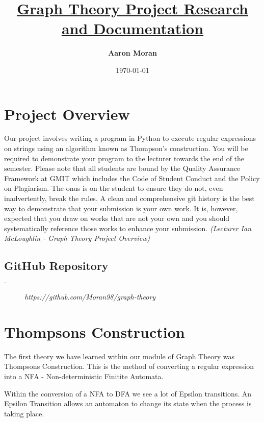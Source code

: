\documentclass[11pt]{article}
\title{\underline{\textbf{ Graph Theory Project Research and Documentation}}}
\author{\textbf{Aaron Moran }}
\date{\today}
\begin{document}
\maketitle	
\pagebreak





\newpage

\tableofcontents

\newpage


\section{Project Overview}
Our project involves writing a program in Python to execute regular expressions on
strings using an algorithm known as Thompson’s construction.
You will be required to
demonstrate your program to the lecturer towards the end of the semester.
Please note that all students are bound by the Quality Assurance Framework at GMIT which includes the Code of Student Conduct and the
Policy on Plagiarism. The onus is on the student to ensure they do not, even
inadvertently, break the rules. A clean and comprehensive git history
 is the best way to demonstrate that your submission is your own
work. It is, however, expected that you draw on works that are not your
own and you should systematically reference those works to enhance your
submission. 
\newline
\emph{(Lecturer Ian McLoughlin - Graph Theory Project Overview)}

\subsection{GitHub Repository}
\begin{description}
\item[$\cdot$]{\emph {https://github.com/Moran98/graph-theory}}
\end{description}
\newpage


\section{Thompsons Construction}

The first theory we have learned within  our module of Graph Theory was Thompsons Construction.
This is the method of converting a regular expression into a NFA - Non-deterministic Finitite Automata.

Within the conversion of a NFA to DFA we see a lot of Epsilon transitions. An Epsilon Transition allows an automaton to change its state when the process is taking place.
\end{document}

